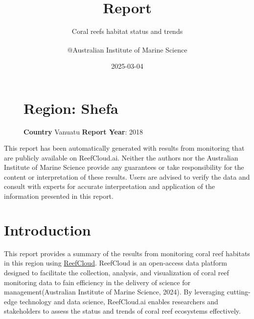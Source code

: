 \documentclass[
  letterpaper,
  DIV=11,
  numbers=noendperiod]{scrartcl}
\title{Report}
\subtitle{Coral reefs habitat status and trends}
\author{@Australian Institute of Marine Science\textsuperscript{}}
\date{2025-03-04}
\makeatletter
\newcommand*\pandocbounded[1]{%
  \sbox\pandoc@box{#1}%
  \Gscale@div\@tempa{\textheight}{\dimexpr\ht\pandoc@box+\dp\pandoc@box\relax}%
  \Gscale@div\@tempb{\linewidth}{\wd\pandoc@box}%
  \ifdim\@tempb\p@<\@tempa\p@\let\@tempa\@tempb\fi%
  \ifdim\@tempa\p@<\p@\scalebox{\@tempa}{\usebox\pandoc@box}%
  \else\usebox{\pandoc@box}%
  \fi%
}
\renewcommand{\maketitle}{\bgroup\setlength{\parindent}{0pt}
\begin{flushleft}
  {\sffamily\huge\textbf{\MakeUppercase{\@title}}} \vspace{0.3cm} \newline
  {\Large {\@subtitle}} \newline
  {\@author} \newline
  \@date
\end{flushleft}\egroup
}
\makeatother
\begin{document}
\maketitle

\pagestyle{mystyle}


\begin{figure}

\begin{minipage}{0.60\linewidth}
\pandocbounded{\texttt{[image: figures/Region\_Map.png]}}\hfill
\end{minipage}%
%
\begin{minipage}{0.40\linewidth}

\section{Region: Shefa}\label{region-shefa}

\textbf{Country} Vanuatu \textbf{Report Year}: 2018\end{minipage}%

\end{figure}%

\begin{tcolorbox}[enhanced jigsaw, rightrule=.15mm, title=\textcolor{quarto-callout-note-color}{\faInfo}\hspace{0.5em}{Disclaimer}, toptitle=1mm, toprule=.15mm, breakable, colback=white, bottomrule=.15mm, colbacktitle=quarto-callout-note-color!10!white, coltitle=black, colframe=quarto-callout-note-color-frame, opacitybacktitle=0.6, opacityback=0, bottomtitle=1mm, arc=.35mm, leftrule=.75mm, titlerule=0mm, left=2mm]

This report has been automatically generated with results from
monitoring that are publicly available on ReefCloud.ai. Neither the
authors nor the Australian Institute of Marine Science provide any
guarantees or take responsibility for the content or interpretation of
these results. Users are advised to verify the data and consult with
experts for accurate interpretation and application of the information
presented in this report.

\end{tcolorbox}

\newpage

\section{Introduction}\label{introduction}

This report provides a summary of the results from monitoring coral reef
habitats in this region using \href{www.reefcloud.ai}{ReefCloud}.
ReefCloud is an open-access data platform designed to facilitate the
collection, analysis, and visualization of coral reef monitoring data to
fain efficiency in the delivery of science for management(Australian
Institute of Marine Science, 2024). By leveraging cutting-edge
technology and data science, ReefCloud.ai enables researchers and
stakeholders to assess the status and trends of coral reef ecosystems
effectively.
\end{document}
